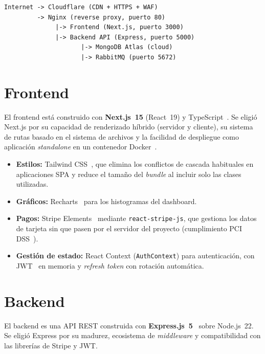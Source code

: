 \begin{lstlisting}[language={},title={Flujo de red en producción}]
Internet -> Cloudflare (CDN + HTTPS + WAF)
         -> Nginx (reverse proxy, puerto 80)
              |-> Frontend (Next.js, puerto 3000)
              |-> Backend API (Express, puerto 5000)
                     |-> MongoDB Atlas (cloud)
                     |-> RabbitMQ (puerto 5672)
\end{lstlisting}

\section{Frontend}

El frontend está construido con \textbf{Next.js~15} (React~19) y TypeScript~\cite{nextjs}. Se eligió Next.js por su capacidad de renderizado híbrido (servidor y cliente), su sistema de rutas basado en el sistema de archivos y la facilidad de despliegue como aplicación \emph{standalone} en un contenedor Docker~\cite{docker}.

\begin{itemize}
  \item \textbf{Estilos:} Tailwind CSS~\cite{tailwind}, que elimina los conflictos de cascada habituales en aplicaciones SPA y reduce el tamaño del \emph{bundle} al incluir solo las clases utilizadas.
  \item \textbf{Gráficos:} Recharts~\cite{recharts} para los histogramas del dashboard.
  \item \textbf{Pagos:} Stripe Elements~\cite{stripe} mediante \texttt{react-stripe-js}, que gestiona los datos de tarjeta sin que pasen por el servidor del proyecto (cumplimiento PCI DSS~\cite{pcidss}).
  \item \textbf{Gestión de estado:} React Context (\texttt{AuthContext}) para autenticación, con JWT~\cite{jwt} en memoria y \emph{refresh token} con rotación automática.
\end{itemize}

\section{Backend}

El backend es una API REST construida con \textbf{Express.js~5}~\cite{expressjs} sobre Node.js~22. Se eligió Express por su madurez, ecosistema de \emph{middleware} y compatibilidad con las librerías de Stripe y JWT.


